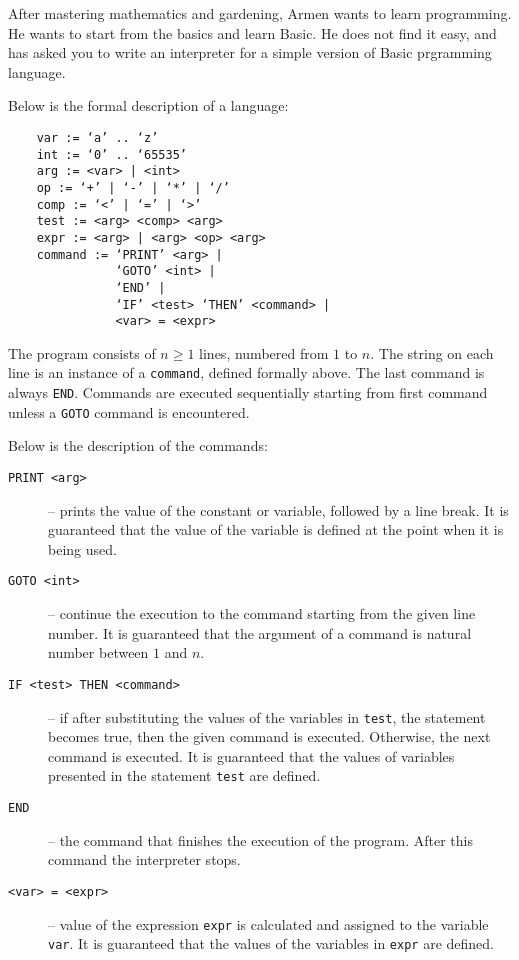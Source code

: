 
After mastering mathematics and gardening, Armen wants to learn programming.
He wants to start from the basics and learn Basic.
He does not find it easy, and has asked you to write an interpreter for a simple version of Basic prgramming language.

Below is the formal description of a language:
\begin{verbatim}
    var := ‘a’ .. ‘z’
    int := ‘0’ .. ‘65535’
    arg := <var> | <int>
    op := ‘+’ | ‘-’ | ‘*’ | ‘/’
    comp := ‘<’ | ‘=’ | ‘>’
    test := <arg> <comp> <arg>
    expr := <arg> | <arg> <op> <arg>
    command := ‘PRINT’ <arg> |
               ‘GOTO’ <int> |
               ‘END’ |
               ‘IF’ <test> ‘THEN’ <command> | 
               <var> = <expr>
\end{verbatim}

The program consists of $n \geq 1$ lines, numbered from $1$ to $n$.
The string on each line is an instance of a \texttt{command}, defined formally above.
The last command is always \texttt{END}.
Commands are executed sequentially starting from first command unless a \texttt{GOTO} command is encountered.

Below is the description of the commands:
\begin{description}
    \item[\texttt{PRINT <arg>}] -- prints the value of the constant or variable, followed by a line break.
    It is guaranteed that the value of the variable is defined at the point when it is being used.
    
    \item[\texttt{GOTO <int>}] -- continue the execution to the command starting from the given line number.
    It is guaranteed that the argument of a command is natural number between $1$ and $n$.
    
    \item[\texttt{IF <test> THEN <command>}] -- if after substituting the values of the variables in \texttt{test}, the statement becomes true, then the given command is executed.
    Otherwise, the next command is executed.
    It is guaranteed that the values of variables presented in the statement \texttt{test} are defined.
    
    \item[\texttt{END}] -- the command that finishes the execution of the program.
    After this command the interpreter stops.
    
    \item[\texttt{<var> = <expr>}] -- value of the expression \texttt{expr} is calculated and assigned to the variable \texttt{var}.
    It is guaranteed that the values of the variables in \texttt{expr} are defined.
\end{description}

